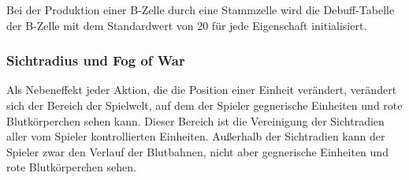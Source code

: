 Bei der Produktion einer B-Zelle durch eine Stammzelle wird die Debuff-Tabelle
der B-Zelle mit dem Standardwert von 20 für jede Eigenschaft initialisiert.

\subsubsection{Sichtradius und Fog of War}
\label{sec:fow}

Als Nebeneffekt jeder Aktion, die die Position einer Einheit verändert,
verändert sich der Bereich der Spielwelt, auf dem der Spieler gegnerische
Einheiten und rote Blutkörperchen sehen kann. Dieser Bereich ist die
Vereinigung der Sichtradien aller vom Spieler kontrollierten Einheiten.
Außerhalb der Sichtradien kann der Spieler zwar den Verlauf der Blutbahnen,
nicht aber gegnerische Einheiten und rote Blutkörperchen sehen.

